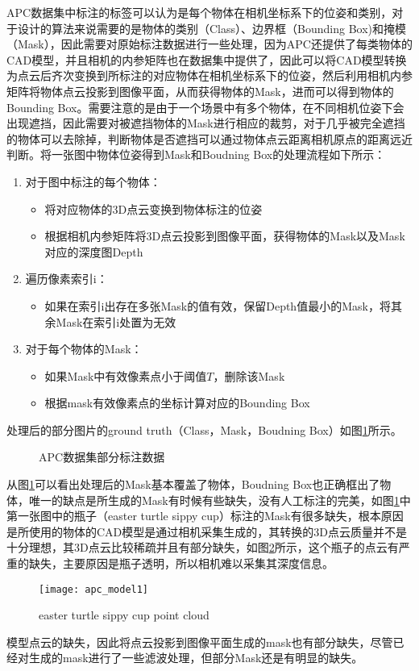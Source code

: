APC数据集中标注的标签可以认为是每个物体在相机坐标系下的位姿和类别，对于设计的算法来说需要的是物体的类别（Class）、边界框（Bounding Box)和掩模（Mask），因此需要对原始标注数据进行一些处理，因为APC还提供了每类物体的CAD模型，并且相机的内参矩阵也在数据集中提供了，因此可以将CAD模型转换为点云后齐次变换到所标注的对应物体在相机坐标系下的位姿，然后利用相机内参矩阵将物体点云投影到图像平面，从而获得物体的Mask，进而可以得到物体的Bounding Box。需要注意的是由于一个场景中有多个物体，在不同相机位姿下会出现遮挡，因此需要对被遮挡物体的Mask进行相应的裁剪，对于几乎被完全遮挡的物体可以去除掉，判断物体是否遮挡可以通过物体点云距离相机原点的距离远近判断。将一张图中物体位姿得到Mask和Boudning Box的处理流程如下所示：
\begin{enumerate}
\item 对于图中标注的每个物体：
  \begin{itemize}
  \item 将对应物体的3D点云变换到物体标注的位姿
  \item 根据相机内参矩阵将3D点云投影到图像平面，获得物体的Mask以及Mask对应的深度图Depth
  \end{itemize}
\item 遍历像素索引i：
  \begin{itemize}
  \item 如果在索引i出存在多张Mask的值有效，保留Depth值最小的Mask，将其余Mask在索引i处置为无效
  \end{itemize}
\item 对于每个物体的Mask：
  \begin{itemize}
  \item 如果Mask中有效像素点小于阈值$T$，删除该Mask
  \item 根据mask有效像素点的坐标计算对应的Bounding Box
  \end{itemize}
\end{enumerate}
处理后的部分图片的ground truth（Class，Mask，Boudning Box）如图\ref{fig:apc_gt}所示。
\begin{figure}[ht]
  \centering
  \hskip1cm
  \vfill
  \hskip1cm
  \caption{APC数据集部分标注数据}
  \label{fig:apc_gt}
\end{figure}
从图\ref{fig:apc_gt}可以看出处理后的Mask基本覆盖了物体，Boudning Box也正确框出了物体，唯一的缺点是所生成的Mask有时候有些缺失，没有人工标注的完美，如图\ref{fig:apc_gt}中第一张图中的瓶子（easter turtle sippy cup）标注的Mask有很多缺失，根本原因是所使用的物体的CAD模型是通过相机采集生成的，其转换的3D点云质量并不是十分理想，其3D点云比较稀疏并且有部分缺失，如图\ref{fig:apc_model}所示，这个瓶子的点云有严重的缺失，主要原因是瓶子透明，所以相机难以采集其深度信息。
\begin{figure}[ht]
  \centering
  \texttt{[image: apc\_model1]}
  \caption{easter turtle sippy cup point cloud}
  \label{fig:apc_model}
\end{figure}
模型点云的缺失，因此将点云投影到图像平面生成的mask也有部分缺失，尽管已经对生成的mask进行了一些滤波处理，但部分Mask还是有明显的缺失。

